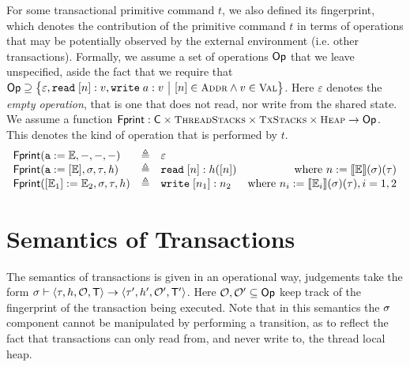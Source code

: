 \documentclass[a4paper,UKenglish]{article}%
\theoremstyle{plain}
\begin{document}
For some transactional primitive command $t$, we also defined its fingerprint, 
which denotes the contribution of the primitive command $t$ in terms of operations that may be 
potentially observed by the external environment (i.e. other transactions). 
Formally, we assume a set of operations $\mathsf{Op}$ that we leave unspecified, aside the fact that 
we require that $\Op \supseteq \Setcon{ \varepsilon, \RD\;[\nat] :\val, \WR\;\addr :\val }{[\nat] \in \Addr \land \val \in \Val }$. 
Here $\varepsilon$ denotes the \emph{empty operation}, that is one that does not read, nor write from the shared state.
We assume a function  $\fingerprint : \cmd \times \ThdStacks \times \TxStacks \times \Heaps \to \Op$. 
This denotes the kind of operation that is performed by  $t$. 
\[
\begin{array}{lclr}
\mathsf{Fprint}(\texttt{a}:=\mathbb{E}, -, -, -) & \triangleq & \varepsilon & \\
\mathsf{Fprint}(\texttt{a}:=[\mathbb{E}],\sigma,\tau,\mathit{h}) & \triangleq  & {{\tt read}}\; [n] : h([n]) & \text{where } n := {\llbracket \mathbb{E} \rrbracket}(\sigma)(\tau)\\
\mathsf{Fprint}([\mathbb{E}_{1}]:=\mathbb{E}_{2},\sigma,\tau,h) & \triangleq & {{\tt write}}\; [n_1] : n_2 & \text{where } n_i := {\llbracket \mathbb{E}_i \rrbracket}(\sigma)(\tau), i=1,2
\end{array}
\]
%
\section{Semantics of Transactions}
The semantics of transactions is given in an operational way, 
judgements take the form $\sigma \vdash \langle \tau, h, \mathcal{O}, \mathsf{T} \rangle 
\to \langle \tau', h', \mathcal{O}', \mathsf{T}' \rangle$. Here $\mathcal{O}, \mathcal{O}' \subseteq \mathsf{Op}$ 
keep track of the fingerprint of the transaction being executed. Note that in this semantics 
the $\sigma$ component cannot be manipulated by performing a transition, as to reflect 
the fact that transactions can only read from, and never write to, the thread local heap.
\end{document}
